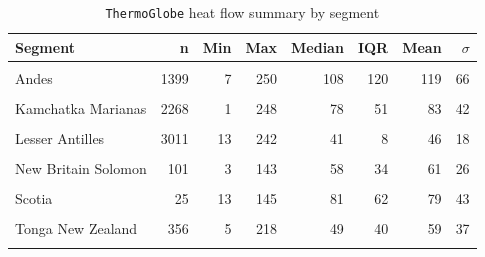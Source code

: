 \begin{table}

\caption{\label{tab:hfSummaryTable}\texttt{ThermoGlobe} heat flow summary by segment}
\centering
\begin{threeparttable}
\begin{tabular}[t]{lrrrrrrr}
\toprule
Segment & n & Min & Max & Median & IQR & Mean & $\sigma$\\
\midrule
\cellcolor{gray!6}{Alaska Aleutians} & \cellcolor{gray!6}{287} & \cellcolor{gray!6}{6} & \cellcolor{gray!6}{196} & \cellcolor{gray!6}{66} & \cellcolor{gray!6}{27} & \cellcolor{gray!6}{71} & \cellcolor{gray!6}{28}\\
Andes & 1399 & 7 & 250 & 108 & 120 & 119 & 66\\
\cellcolor{gray!6}{Central America} & \cellcolor{gray!6}{1442} & \cellcolor{gray!6}{8} & \cellcolor{gray!6}{250} & \cellcolor{gray!6}{90} & \cellcolor{gray!6}{123} & \cellcolor{gray!6}{110} & \cellcolor{gray!6}{67}\\
Kamchatka Marianas & 2268 & 1 & 248 & 78 & 51 & 83 & 42\\
\cellcolor{gray!6}{Kyushu Ryukyu} & \cellcolor{gray!6}{1895} & \cellcolor{gray!6}{3} & \cellcolor{gray!6}{250} & \cellcolor{gray!6}{76} & \cellcolor{gray!6}{42} & \cellcolor{gray!6}{84} & \cellcolor{gray!6}{42}\\
Lesser Antilles & 3011 & 13 & 242 & 41 & 8 & 46 & 18\\
\cellcolor{gray!6}{N Philippines} & \cellcolor{gray!6}{568} & \cellcolor{gray!6}{3} & \cellcolor{gray!6}{231} & \cellcolor{gray!6}{71} & \cellcolor{gray!6}{26} & \cellcolor{gray!6}{75} & \cellcolor{gray!6}{33}\\
New Britain Solomon & 101 & 3 & 143 & 58 & 34 & 61 & 26\\
\cellcolor{gray!6}{S Philippines} & \cellcolor{gray!6}{460} & \cellcolor{gray!6}{1} & \cellcolor{gray!6}{224} & \cellcolor{gray!6}{71} & \cellcolor{gray!6}{32} & \cellcolor{gray!6}{74} & \cellcolor{gray!6}{34}\\
Scotia & 25 & 13 & 145 & 81 & 62 & 79 & 43\\
\cellcolor{gray!6}{Sumatra Banda Sea} & \cellcolor{gray!6}{1416} & \cellcolor{gray!6}{1} & \cellcolor{gray!6}{247} & \cellcolor{gray!6}{59} & \cellcolor{gray!6}{63} & \cellcolor{gray!6}{68} & \cellcolor{gray!6}{42}\\
Tonga New Zealand & 356 & 5 & 218 & 49 & 40 & 59 & 37\\
\cellcolor{gray!6}{Vanuatu} & \cellcolor{gray!6}{137} & \cellcolor{gray!6}{1} & \cellcolor{gray!6}{223} & \cellcolor{gray!6}{61} & \cellcolor{gray!6}{62} & \cellcolor{gray!6}{80} & \cellcolor{gray!6}{52}\\

\end{tabular}
\end{threeparttable}
\end{table}
